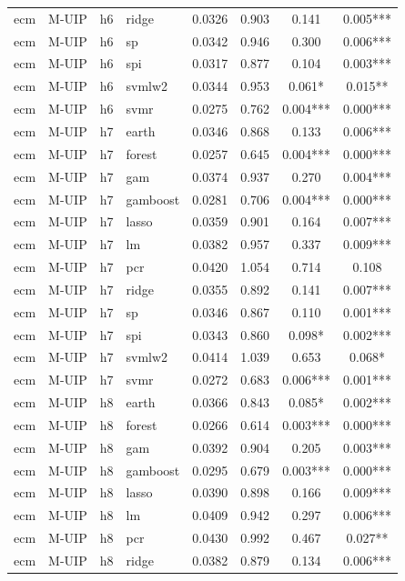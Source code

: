 \begin{ThreePartTable}
\begin{longtable}[t]{llclcccc}
ecm & M-UIP & h6 & ridge & 0.0326 & 0.903 & 0.141 & 0.005***\\
ecm & M-UIP & h6 & sp & 0.0342 & 0.946 & 0.300 & 0.006***\\
ecm & M-UIP & h6 & spi & 0.0317 & 0.877 & 0.104 & 0.003***\\
ecm & M-UIP & h6 & svmlw2 & 0.0344 & 0.953 & 0.061* & 0.015**\\
ecm & M-UIP & h6 & svmr & 0.0275 & 0.762 & 0.004*** & 0.000***\\
\addlinespace
ecm & M-UIP & h7 & earth & 0.0346 & 0.868 & 0.133 & 0.006***\\
ecm & M-UIP & h7 & forest & 0.0257 & 0.645 & 0.004*** & 0.000***\\
ecm & M-UIP & h7 & gam & 0.0374 & 0.937 & 0.270 & 0.004***\\
ecm & M-UIP & h7 & gamboost & 0.0281 & 0.706 & 0.004*** & 0.000***\\
ecm & M-UIP & h7 & lasso & 0.0359 & 0.901 & 0.164 & 0.007***\\
ecm & M-UIP & h7 & lm & 0.0382 & 0.957 & 0.337 & 0.009***\\
ecm & M-UIP & h7 & pcr & 0.0420 & 1.054 & 0.714 & 0.108\\
ecm & M-UIP & h7 & ridge & 0.0355 & 0.892 & 0.141 & 0.007***\\
ecm & M-UIP & h7 & sp & 0.0346 & 0.867 & 0.110 & 0.001***\\
ecm & M-UIP & h7 & spi & 0.0343 & 0.860 & 0.098* & 0.002***\\
ecm & M-UIP & h7 & svmlw2 & 0.0414 & 1.039 & 0.653 & 0.068*\\
ecm & M-UIP & h7 & svmr & 0.0272 & 0.683 & 0.006*** & 0.001***\\
\addlinespace
ecm & M-UIP & h8 & earth & 0.0366 & 0.843 & 0.085* & 0.002***\\
ecm & M-UIP & h8 & forest & 0.0266 & 0.614 & 0.003*** & 0.000***\\
ecm & M-UIP & h8 & gam & 0.0392 & 0.904 & 0.205 & 0.003***\\
ecm & M-UIP & h8 & gamboost & 0.0295 & 0.679 & 0.003*** & 0.000***\\
ecm & M-UIP & h8 & lasso & 0.0390 & 0.898 & 0.166 & 0.009***\\
ecm & M-UIP & h8 & lm & 0.0409 & 0.942 & 0.297 & 0.006***\\
ecm & M-UIP & h8 & pcr & 0.0430 & 0.992 & 0.467 & 0.027**\\
ecm & M-UIP & h8 & ridge & 0.0382 & 0.879 & 0.134 & 0.006***\\

\end{longtable}
\end{ThreePartTable}
